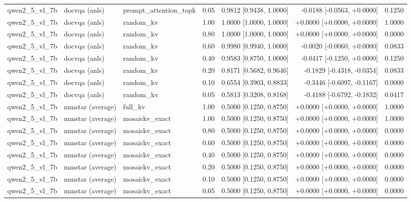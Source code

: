 \begin{longtable}{lllrrrr}
qwen2\_5\_vl\_7b & docvqa (anls) & prompt\_attention\_topk & 0.05 & 0.9812 [0.9438, 1.0000] & -0.0188 [-0.0563, +0.0000] & 0.1250 \\
qwen2\_5\_vl\_7b & docvqa (anls) & random\_kv & 1.00 & 1.0000 [1.0000, 1.0000] & +0.0000 [+0.0000, +0.0000] & 1.0000 \\
qwen2\_5\_vl\_7b & docvqa (anls) & random\_kv & 0.80 & 1.0000 [1.0000, 1.0000] & +0.0000 [+0.0000, +0.0000] & 0.0000 \\
qwen2\_5\_vl\_7b & docvqa (anls) & random\_kv & 0.60 & 0.9980 [0.9940, 1.0000] & -0.0020 [-0.0060, +0.0000] & 0.0833 \\
qwen2\_5\_vl\_7b & docvqa (anls) & random\_kv & 0.40 & 0.9583 [0.8750, 1.0000] & -0.0417 [-0.1250, +0.0000] & 0.1250 \\
qwen2\_5\_vl\_7b & docvqa (anls) & random\_kv & 0.20 & 0.8171 [0.5682, 0.9646] & -0.1829 [-0.4318, -0.0354] & 0.0833 \\
qwen2\_5\_vl\_7b & docvqa (anls) & random\_kv & 0.10 & 0.6554 [0.3903, 0.8833] & -0.3446 [-0.6097, -0.1167] & 0.0000 \\
qwen2\_5\_vl\_7b & docvqa (anls) & random\_kv & 0.05 & 0.5813 [0.3208, 0.8168] & -0.4188 [-0.6792, -0.1832] & 0.0417 \\
qwen2\_5\_vl\_7b & mmstar (average) & full\_kv & 1.00 & 0.5000 [0.1250, 0.8750] & +0.0000 [+0.0000, +0.0000] & 1.0000 \\
qwen2\_5\_vl\_7b & mmstar (average) & mosaickv\_exact & 1.00 & 0.5000 [0.1250, 0.8750] & +0.0000 [+0.0000, +0.0000] & 1.0000 \\
qwen2\_5\_vl\_7b & mmstar (average) & mosaickv\_exact & 0.80 & 0.5000 [0.1250, 0.8750] & +0.0000 [+0.0000, +0.0000] & 0.0000 \\
qwen2\_5\_vl\_7b & mmstar (average) & mosaickv\_exact & 0.60 & 0.5000 [0.1250, 0.8750] & +0.0000 [+0.0000, +0.0000] & 0.0000 \\
qwen2\_5\_vl\_7b & mmstar (average) & mosaickv\_exact & 0.40 & 0.5000 [0.1250, 0.8750] & +0.0000 [+0.0000, +0.0000] & 0.0000 \\
qwen2\_5\_vl\_7b & mmstar (average) & mosaickv\_exact & 0.20 & 0.5000 [0.1250, 0.8750] & +0.0000 [+0.0000, +0.0000] & 0.0000 \\
qwen2\_5\_vl\_7b & mmstar (average) & mosaickv\_exact & 0.10 & 0.5000 [0.1250, 0.8750] & +0.0000 [+0.0000, +0.0000] & 0.0000 \\
qwen2\_5\_vl\_7b & mmstar (average) & mosaickv\_exact & 0.05 & 0.5000 [0.1250, 0.8750] & +0.0000 [+0.0000, +0.0000] & 0.0000 \\

\end{longtable}
